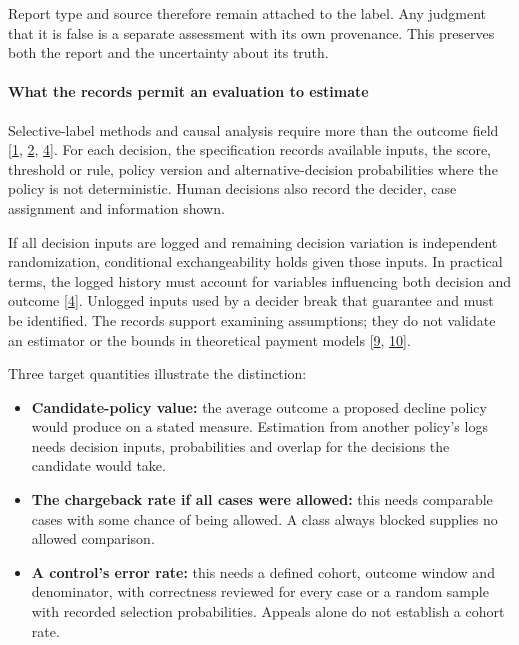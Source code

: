 \documentclass[
  11pt,
]{article}
\providecommand{\tightlist}{%
  \setlength{\itemsep}{0pt}\setlength{\parskip}{0pt}}
\renewcommand{\tightlist}{\setlength{\itemsep}{0pt plus 1pt}\setlength{\parskip}{0pt}}
\begin{document}
Report type and source therefore remain attached to the label. Any
judgment that it is false is a separate assessment with its own
provenance. This preserves both the report and the uncertainty about its
truth.

\hypertarget{what-the-records-permit-an-evaluation-to-estimate}{%
\paragraph{What the records permit an evaluation to
estimate}\label{what-the-records-permit-an-evaluation-to-estimate}}

Selective-label methods and causal analysis require more than the
outcome field {[}\protect\hyperlink{ref-Lakkaraju2017Selective}{1},
\protect\hyperlink{ref-Kilbertus2020Fair}{2},
\protect\hyperlink{ref-HernanRobins2020}{4}{]}. For each decision, the
specification records available inputs, the score, threshold or rule,
policy version and alternative-decision probabilities where the policy
is not deterministic. Human decisions also record the decider, case
assignment and information shown.

If all decision inputs are logged and remaining decision variation is
independent randomization, conditional exchangeability holds given those
inputs. In practical terms, the logged history must account for
variables influencing both decision and outcome
{[}\protect\hyperlink{ref-HernanRobins2020}{4}{]}. Unlogged inputs used
by a decider break that guarantee and must be identified. The records
support examining assumptions; they do not validate an estimator or the
bounds in theoretical payment models
{[}\protect\hyperlink{ref-Dhama2026Causal}{9},
\protect\hyperlink{ref-Dhama2026Limits}{10}{]}.

Three target quantities illustrate the distinction:

\begin{itemize}
\tightlist
\item
  \textbf{Candidate-policy value:} the average outcome a proposed
  decline policy would produce on a stated measure. Estimation from
  another policy's logs needs decision inputs, probabilities and overlap
  for the decisions the candidate would take.
\item
  \textbf{The chargeback rate if all cases were allowed:} this needs
  comparable cases with some chance of being allowed. A class always
  blocked supplies no allowed comparison.
\item
  \textbf{A control's error rate:} this needs a defined cohort, outcome
  window and denominator, with correctness reviewed for every case or a
  random sample with recorded selection probabilities. Appeals alone do
  not establish a cohort rate.
\end{itemize}
\end{document}
